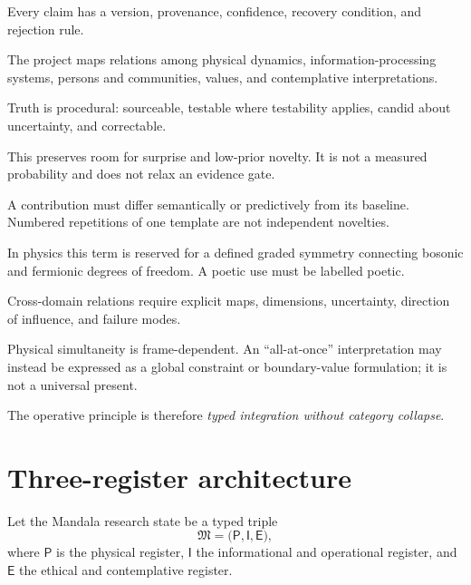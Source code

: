 \documentclass[11pt]{article}
\begin{document}
\begin{description}[style=nextline,leftmargin=1.4in]
\item[Evolving] Every claim has a version, provenance, confidence, recovery condition, and rejection rule.
\item[Grand Mandala] The project maps relations among physical dynamics, information-processing systems, persons and communities, values, and contemplative interpretations.
\item[True] Truth is procedural: sourceable, testable where testability applies, candid about uncertainty, and correctable.
\item[1\% miraculous] This preserves room for surprise and low-prior novelty. It is not a measured probability and does not relax an evidence gate.
\item[Novelty] A contribution must differ semantically or predictively from its baseline. Numbered repetitions of one template are not independent novelties.
\item[Supersymmetric] In physics this term is reserved for a defined graded symmetry connecting bosonic and fermionic degrees of freedom. A poetic use must be labelled poetic.
\item[Integration] Cross-domain relations require explicit maps, dimensions, uncertainty, direction of influence, and failure modes.
\item[Simultaneity] Physical simultaneity is frame-dependent. An ``all-at-once'' interpretation may instead be expressed as a global constraint or boundary-value formulation; it is not a universal present.
\end{description}

The operative principle is therefore \emph{typed integration without category collapse}.

\section{Three-register architecture}

Let the Mandala research state be a typed triple
\begin{equation}
\mathfrak{M}=\bigl(\mathsf{P},\mathsf{I},\mathsf{E}\bigr),
\end{equation}
where $\mathsf{P}$ is the physical register, $\mathsf{I}$ the informational and operational register, and $\mathsf{E}$ the ethical and contemplative register.
\end{document}
